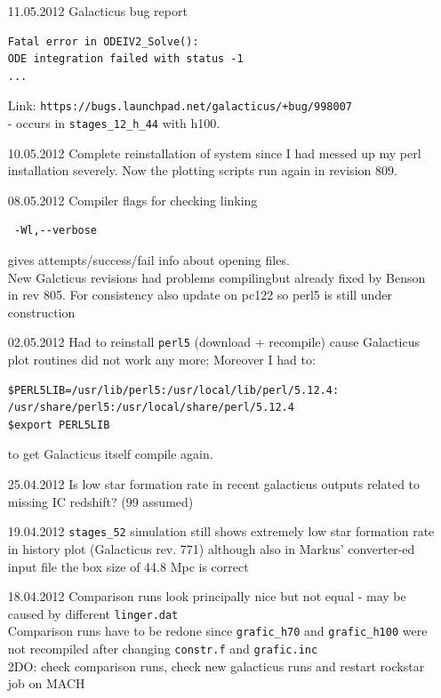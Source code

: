 \begin{itemize}
\item[11.05.2012]
Galacticus bug report 
\begin{verbatim}
Fatal error in ODEIV2_Solve():
ODE integration failed with status -1
...
\end{verbatim}
Link: \texttt{https://bugs.launchpad.net/galacticus/+bug/998007} \\ - 
occurs in \texttt{stages\_12\_h\_44} with h100. 

\item[10.05.2012]
Complete reinstallation of system since I had messed up my perl installation 
severely. Now the plotting scripts run again in revision 809. 

\item[08.05.2012]
Compiler flags for checking linking 
\begin{verbatim}
 -Wl,--verbose
\end{verbatim}
gives attempts/success/fail info about opening files. \\
New Galcticus revisions had problems compilingbut already 
fixed by Benson in rev 805. For consistency also update 
on pc122 so perl5 is still under construction \\

\item[02.05.2012]
Had to reinstall \texttt{perl5} (download + recompile) 
cause Galacticus plot routines did not work any more: 
Moreover I had to: 
\begin{verbatim}
$PERL5LIB=/usr/lib/perl5:/usr/local/lib/perl/5.12.4:
/usr/share/perl5:/usr/local/share/perl/5.12.4
$export PERL5LIB
\end{verbatim}
to get Galacticus itself compile again. \\

\item[25.04.2012]
Is low star formation rate in recent galacticus outputs 
related to missing IC redshift? (99 assumed) \\

\item[19.04.2012]
\texttt{stages\_52} simulation still shows extremely low 
star formation rate in history plot (Galacticus rev. 771) 
although also in Markus' converter-ed input file the box 
size of 44.8 Mpc is correct \\ 


\item[18.04.2012]
Comparison runs look principally nice but not equal - may be 
caused by different \texttt{linger.dat} \\
Comparison runs have to be redone since \texttt{grafic\_h70}
and \texttt{grafic\_h100} were 
not recompiled after changing \texttt{constr.f} and \texttt{grafic.inc} \\
2DO: check comparison runs, check new galacticus runs and 
restart rockstar job on MACH \\


\end{itemize}
